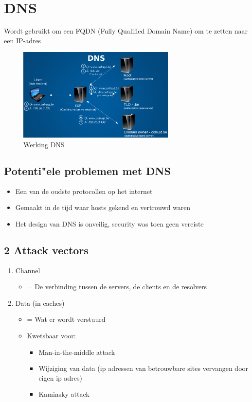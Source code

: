 \documentclass{article}
\begin{document}
\section{DNS}

Wordt gebruikt om een FQDN (Fully Qualified Domain Name) om te zetten naar een IP-adres

\begin{figure}[H]
    \centering
    \includegraphics[width=0.7\textwidth]{dns.png}
    \caption{Werking DNS}
\end{figure}


\subsection{Potenti"ele problemen met DNS}

\begin{itemize}
    \item Een van de oudste protocollen op het internet
    \item Gemaakt in de tijd waar hosts gekend en vertrouwd waren
    \item Het design van DNS is onveilig, security was toen geen vereiste
\end{itemize}

\subsection{2 Attack vectors}

\begin{enumerate}
    \item Channel
    \begin{itemize}
        \item = De verbinding tussen de servers, de clients en de resolvers
    \end{itemize}
    \item Data (in caches)
    \begin{itemize}
        \item = Wat er wordt verstuurd
        \item Kwetsbaar voor:
        \begin{itemize}
            \item Man-in-the-middle attack
            \item Wijziging van data (ip adressen van betrouwbare sites vervangen door eigen ip adres)
            \item Kaminsky attack
        \end{itemize}
    \end{itemize}
\end{enumerate}
\end{document}
